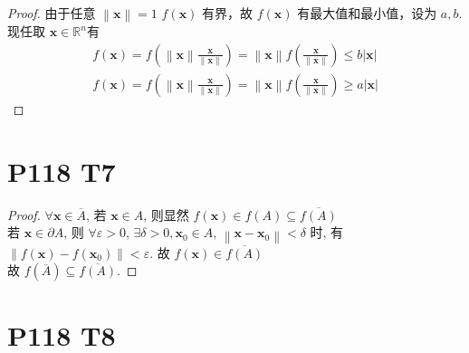 \documentclass{article}
\begin{document}
\begin{proof}
    由于任意 $\left\lVert \boldsymbol{x}\right\rVert = 1$ $f(\boldsymbol{x})$ 有界，故 $f(\boldsymbol{x})$ 有最大值和最小值，设为 $a, b$. \\
    现任取 $\boldsymbol{x} \in \mathbb{R}^n$有 
    \begin{align*}
        f(\boldsymbol{x}) = f\left(\left\lVert \boldsymbol{x}\right\rVert \frac{\boldsymbol{x}}{\left\lVert \boldsymbol{x}\right\rVert}\right) = \left\lVert \boldsymbol{x}\right\rVert f\left(\frac{\boldsymbol{x}}{\left\lVert \boldsymbol{x}\right\rVert}\right) \leq b \left\lvert \boldsymbol{x}\right\rvert \\
        f(\boldsymbol{x}) = f\left(\left\lVert \boldsymbol{x}\right\rVert \frac{\boldsymbol{x}}{\left\lVert \boldsymbol{x}\right\rVert}\right) = \left\lVert \boldsymbol{x}\right\rVert f\left(\frac{\boldsymbol{x}}{\left\lVert \boldsymbol{x}\right\rVert}\right) \geq a \left\lvert \boldsymbol{x}\right\rvert
    \end{align*}
\end{proof}

\section*{P118 T7}

\begin{proof}
    $\forall \boldsymbol{x} \in \overline{A}$, 若 $\boldsymbol{x} \in A$, 则显然 $f(\boldsymbol{x}) \in f(A) \subseteq \overline{f(A)}$ \\
    若 $\boldsymbol{x} \in \partial A$, 则 $\forall \varepsilon > 0$, $\exists \delta > 0, \boldsymbol{x}_0 \in A$, $\left\lVert \boldsymbol{x} - \boldsymbol{x}_0\right\rVert < \delta$ 时, 有 $\left\lVert f(\boldsymbol{x}) - f(\boldsymbol{x}_0)\right\rVert < \varepsilon$. 故 $f(\boldsymbol{x}) \in \overline{f(A)}$ \\
    故 $f(\overline{A}) \subseteq \overline{f(A)}$.
\end{proof}

\section*{P118 T8}
\end{document}
